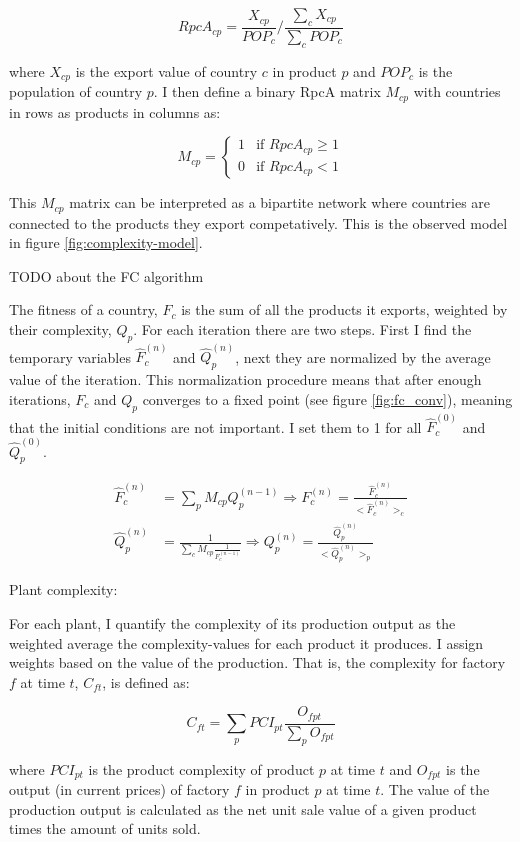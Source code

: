 \documentclass[11pt]{article}
\begin{document}
\[
	RpcA_{cp} = \frac{X_{cp}}{POP_{c}} \bigg / \frac{\sum_c X_{cp}}{\sum_c POP_c}
\]

where \(X_{cp}\) is the export value of country \(c\) in product \(p\) and \(POP_{c}\) is the population of country \(p\). I then define a binary RpcA matrix \(M_{cp}\) with countries in rows as products in columns as:

\[
M_{cp} = \begin{cases}
 1 & \text{if } RpcA_{cp} \geq 1 \\
 0 & \text{if } RpcA_{cp} < 1
\end{cases}
\]

This \(M_{cp}\) matrix can be interpreted as a bipartite network where countries are connected to the products they export competatively. This is the observed model in figure \ref{fig:complexity-model}. 

TODO about the FC algorithm 

The fitness of a country, \(F_{c}\) is the sum of all the products it exports, weighted by their complexity, \(Q_{p}\). For each iteration there are two steps. First I find the temporary variables \(\hat{F}^{(n)}_{c}\) and \(\hat{Q}^{(n)}_{p}\), next they are normalized by the average value of the iteration. This normalization procedure means that after enough iterations, \(F_{c}\) and \(Q_{p}\) converges to a fixed point (see figure \ref{fig:fc_conv}), meaning that the initial conditions are not important. I set them to 1 for all \(\hat{F}^{(0)}_{c}\) and \(\hat{Q}^{(0)}_{p}\).

 \[
	 \begin{split}
		 \hat{F}^{(n)}_{c} &= \sum_p M_{cp} Q^{(n-1)}_{p} \Rightarrow F^{(n)}_{c} = \frac{\hat{F}^{(n)}_{c}}{\bigg < \hat{F}^{(n)}_c \bigg > _c} \\
		 \hat{Q}^{(n)}_{p} &= \frac{1}{\sum_c M_{cp} \frac{1}{F^{(n-1)}_c}} \Rightarrow Q^{(n)}_{p} = \frac{\hat{Q}^{(n)}_{p}}{\bigg < \hat{Q}^{(n)}_p \bigg > _p }
	 \end{split}
\]

Plant complexity:

For each plant, I quantify the complexity of its production output as the weighted average the complexity-values for each product it produces. I assign weights based on the value of the production. That is, the complexity for factory \(f\) at time \(t\), \(C_{ft}\), is defined as:

$$
C_{ft} = \sum_p PCI_{pt} \frac{O_{fpt}}{\sum_p O_{fpt}}
$$

where \(PCI_{pt}\) is the product complexity of product \(p\) at time \(t\) and \(O_{fpt}\) is the output (in current prices) of factory \(f\) in product \(p\) at time \(t\). The value of the production output is calculated as the net unit sale value of a given product times the amount of units sold. 
\end{document}
